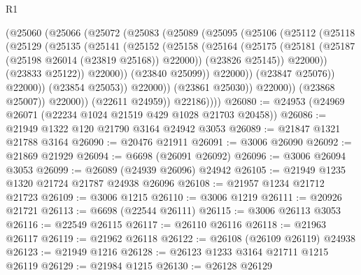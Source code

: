 \begin{lexlean}{R1}
\begin{coremodule}
                        (@25060
                          (@25066
                            (@25072
                              (@25083
                                (@25089
                                  (@25095
                                    (@25106
                                      (@25112
                                        (@25118
                                          (@25129
                                            (@25135
                                              (@25141
                                                (@25152
                                                  (@25158
                                                    (@25164
                                                      (@25175
                                                        (@25181
                                                          (@25187
                                                            (@25198 @26014 (@23819 @25168))
                                                            @22000))
                                                        (@23826 @25145))
                                                      @22000))
                                                  (@23833 @25122))
                                                @22000))
                                            (@23840 @25099))
                                          @22000))
                                      (@23847 @25076))
                                    @22000))
                                (@23854 @25053))
                              @22000))
                          (@23861 @25030))
                        @22000))
                    (@23868 @25007))
                  @22000))
              (@22611 @24959))
            @22186))))
@26080 := @24953 (@24969 @26071 (@22234 @1024 @21519 @429 @1028 @21703 @20458))
@26086 := @21949 @1322 @120 @21790 @3164 @24942 @3053
@26089 := @21847 @1321 @21788 @3164
@26090 := @20476 @21911
@26091 := @3006 @26090
@26092 := @21869 @21929
@26094 := @6698 (@26091 @26092)
@26096 := @3006 @26094 @3053
@26099 := @26089 (@24939 @26096) @24942
@26105 := @21949 @1235 @1320 @21724 @21787 @24938 @26096
@26108 := @21957 @1234 @21712 @21723
@26109 := @3006 @1215
@26110 := @3006 @1219
@26111 := @20926 @21721
@26113 := @6698 (@22544 @26111)
@26115 := @3006 @26113 @3053
@26116 := @22549 @26115
@26117 := @26110 @26116
@26118 := @21963 @26117
@26119 := @21962 @26118
@26122 := @26108 (@26109 @26119) @24938
@26123 := @21949 @1216
@26128 := @26123 @1233 @3164 @21711 @1215 @26119
@26129 := @21984 @1215
@26130 := @26128 @26129

\end{coremodule}
\end{lexlean}
